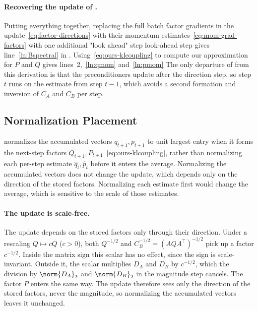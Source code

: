\paragraph{Recovering the update of .} 
Putting everything together, replacing the full batch factor gradients in
the update~\eqref{eq:factor-directions} with their momentum estimates~\eqref{eq:mom-grad-factors} with one additional "look ahead" step look-ahead step gives line~\ref{ln:Bspectral} in . Using~\eqref{eq:ours-klcoupling} to compute our approximation for $P$ and $Q$ gives lines~2,~\ref{ln:qmom} and~\ref{ln:pmom}  
 The only departure of 
from this derivation is that the preconditioners update after the
direction step, so step $t$ runs on the estimate from step $t-1$, which
avoids a second formation and inversion of $C_A$ and $C_B$ per step.

\subsection{Normalization Placement}
\label{sec:scale-placement}
\methodname{} normalizes the accumulated vectors $q_{t+1},p_{t+1}$ to unit
largest entry when it forms the next-step factors
$Q_{t+1},P_{t+1}$~\eqref{eq:ours-klcoupling}, rather than normalizing each
per-step estimate $\hat{q}_t,\hat{p}_t$ before it enters the average.
Normalizing the accumulated vectors does not change the update, which
depends only on the direction of the stored factors. Normalizing each
estimate first would change the average, which is sensitive to the scale
of those estimates.

\paragraph{The update is scale-free.} The update depends on the stored
factors only through their direction. Under a rescaling $Q\mapsto cQ$
($c>0$), both $Q^{-1/2}$ and $C_B^{-1/2}=(AQA^\top)^{-1/2}$ pick up a
factor $c^{-1/2}$. Inside the matrix sign this scalar has no effect, since
the sign is scale-invariant. Outside it, the scalar multiplies $D_A$ and
$D_B$ by $c^{-1/2}$, which the division by $\norm{D_A}_2$ and
$\norm{D_B}_2$ in the magnitude step cancels. The factor $P$ enters the
same way. The update therefore sees only the direction of the stored
factors, never the magnitude, so normalizing the accumulated
vectors leaves it unchanged.

